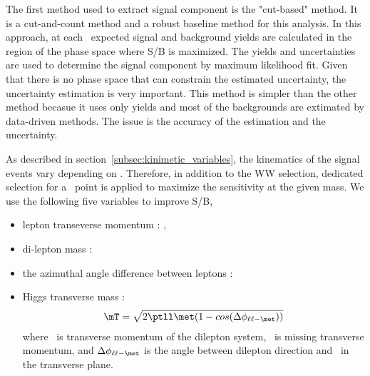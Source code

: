 The first method used to extract signal component is the "cut-based" method. 
It is a cut-and-count method and a robust baseline method for this analysis. 
In this approach, at each \mHi\ expected signal and background yields are 
calculated in the region of the phase space where S/B is maximized. 
The yields and uncertainties are used to determine the signal component 
by maximum likelihood fit. Given that there is no phase space that can 
constrain the estimated uncertainty, the uncertainty estimation is very important.  
This method is simpler than the other method becasue it uses only yields 
and most of the backgrounds are extimated by data-driven methods. 
The issue is the accuracy of the estimation and the uncertainty.  

As described in section~\ref{subsec:kinimetic_variables}, the kinematics of 
the signal events vary depending on \mHi. Therefore, 
in addition to the WW selection, dedicated selection 
for a \mHi\ point is applied to maximize the sensitivity at the given mass. 
We use the following five variables to improve S/B, 
\begin{itemize}
\item lepton transeverse momentum : \ptlmax, \ptlmin
\item di-lepton mass : \mll 
\item the azimuthal angle difference between leptons : \delphill
\item Higgs transverse mass : 
\begin{eqnarray} 
\mT = \sqrt{2\ptll\met(1-cos(\Delta\phi_{\ell\ell-\met}))}
\end{eqnarray} 
where \ptll\ is transverse momentum of the dilepton system,
\met\ is missing transverse momentum, and
$\Delta\phi_{\ell\ell-\met}$ is the angle between dilepton
direction and \met\ in the transverse plane.
\end{itemize}

